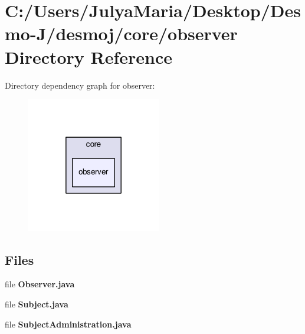 \section{C\-:/\-Users/\-Julya\-Maria/\-Desktop/\-Desmo-\/\-J/desmoj/core/observer Directory Reference}
\label{dir_b17e5d2ab8815e9983c6f7416dc67d49}
Directory dependency graph for observer\-:
\nopagebreak
\begin{figure}[H]
\begin{center}
\leavevmode
\includegraphics[width=166pt]{dir_b17e5d2ab8815e9983c6f7416dc67d49_dep}
\end{center}
\end{figure}
\subsection*{Files}
\begin{DoxyCompactItemize}
\item 
file {\bfseries Observer.\-java}
\item 
file {\bfseries Subject.\-java}
\item 
file {\bfseries Subject\-Administration.\-java}
\end{DoxyCompactItemize}
